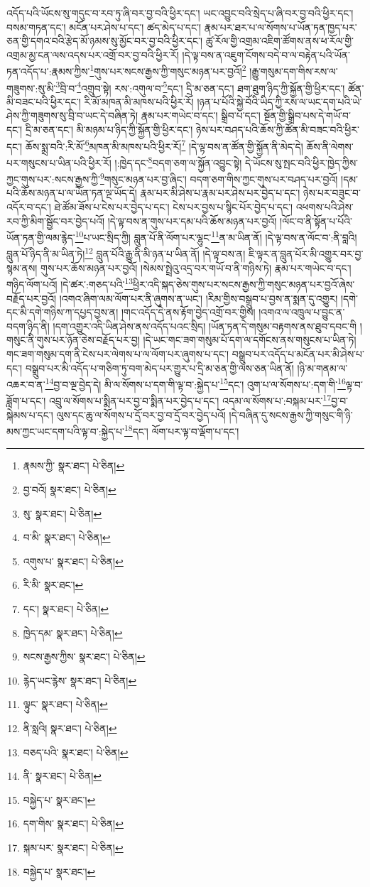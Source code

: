 འདོད་པའི་ཡོངས་སུ་གདུང་བ་རབ་ཏུ་ཞི་བར་བྱ་བའི་ཕྱིར་དང་། ཡང་འབྱུང་བའི་སྲེད་པ་ཞི་བར་བྱ་བའི་ཕྱིར་དང་། བསམ་གཏན་དང་། མངོན་པར་ཤེས་པ་དང་། ཚད་མེད་པ་དང་། རྣམ་པར་ཐར་པ་ལ་སོགས་པ་ཡོན་ཏན་ཁྱད་པར་ཅན་གྱི་དགའ་བའི་རྩེད་མོ་ཉམས་སུ་མྱོང་བར་བྱ་བའི་ཕྱིར་དང་། ཚུ་རོལ་གྱི་འགྲམ་འཇིག་ཚོགས་ནས་ཕ་རོལ་གྱི་འགྲམ་མྱ་ངན་ལས་འདས་པར་འགྲོ་བར་བྱ་བའི་ཕྱིར་རོ། །དེ་ལྟ་བས་ན་འཇུག་ངོགས་བདེ་བ་ལ་བརྟེན་པའི་ཡོན་ཏན་འདོད་པ་:རྣམས་ཀྱིས་\footnote{རྣམས་ཀྱི་  སྣར་ཐང་།  པེ་ཅིན། }གུས་པར་སངས་རྒྱས་ཀྱི་གསུང་མཉན་པར་བྱའོ།\footnote{བྱ་བའོ།  སྣར་ཐང་།  པེ་ཅིན། } །རྒྱུ་གསུམ་དག་གིས་རས་ལ་གཟུགས་:སུ་མི་\footnote{སུ་  སྣར་ཐང་།  པེ་ཅིན། }བྲི་བ་\footnote{བ་མི་  སྣར་ཐང་།  པེ་ཅིན། }འགྲུབ་སྟེ། རས་:འགུལ་བ་\footnote{འགུས་པ་  སྣར་ཐང་།  པེ་ཅིན། }དང་། དྲི་མ་ཅན་དང་། ཐག་ཐུག་ཉིད་ཀྱི་སྐྱོན་གྱི་ཕྱིར་དང་། ཚོན་མི་བཟང་པའི་ཕྱིར་དང་། རི་མོ་མཁན་མི་མཁས་པའི་ཕྱིར་རོ། །ཉན་པ་པོའི་སྐྱེ་བོའི་ཡིད་ཀྱི་རས་ལ་ཡང་དག་པའི་ཡེ་ཤེས་ཀྱི་གཟུགས་སུ་བྲི་བ་ཡང་དེ་བཞིན་ཏེ། རྣམ་པར་གཡེང་བ་དང་། སྒྲིབ་པ་དང་། སྔོན་གྱི་སྒྲིབ་པས་དེ་གཡོ་བ་དང་། དྲི་མ་ཅན་དང་། མི་མཉམ་པ་ཉིད་ཀྱི་སྐྱོན་གྱི་ཕྱིར་དང་། ཉེས་པར་བཤད་པའི་ཆོས་ཀྱི་ཚོན་མི་བཟང་བའི་ཕྱིར་དང་། ཆོས་སྨྲ་བའི་:རི་མོ་\footnote{རི་མི་  སྣར་ཐང་། }མཁན་མི་མཁས་པའི་ཕྱིར་རོ།\footnote{དང་།  སྣར་ཐང་།  པེ་ཅིན། } །དེ་ལྟ་བས་ན་ཚོན་གྱི་སྐྱོན་ནི་མེད་དེ། ཆོས་ནི་ལེགས་པར་གསུངས་པ་ཡིན་པའི་ཕྱིར་རོ། །:ཁྱེད་དང་\footnote{ཁྱེད་དམ་  སྣར་ཐང་།  པེ་ཅིན། }བདག་ཅག་ལ་སྐྱོན་འབྱུང་སྟེ། དེ་ཡོངས་སུ་སྤང་བའི་ཕྱིར་ཁྱེད་ཀྱིས་ཀྱང་གུས་པར་:སངས་རྒྱས་ཀྱི་\footnote{སངས་རྒྱས་ཀྱིས་  སྣར་ཐང་།  པེ་ཅིན། }གསུང་མཉན་པར་བྱ་ཞིང་། བདག་ཅག་གིས་ཀྱང་གུས་པར་བཤད་པར་བྱའོ། །དམ་པའི་ཆོས་མཉན་པ་ལ་ཡོན་ཏན་ལྔ་ཡོད་དེ། རྣམ་པར་མི་ཤེས་པ་རྣམ་པར་ཤེས་པར་བྱེད་པ་དང་། ཉེས་པར་བཟུང་བ་འདོར་བ་དང་། ཐེ་ཚོམ་ཟོས་པ་ངེས་པར་བྱེད་པ་དང་། ངེས་པར་བྱས་པ་སྙིང་པོར་བྱེད་པ་དང་། འཕགས་པའི་ཤེས་རབ་ཀྱི་མིག་སྦྱོང་བར་བྱེད་པའོ། །དེ་ལྟ་བས་ན་གུས་པར་དམ་པའི་ཆོས་མཉན་པར་བྱའོ། །ལོང་བ་ནི་སྟོན་པ་པོའི་ཡོན་ཏན་གྱི་ལམ་རྙེད་\footnote{རྙེད་ཡང་རྙེས་  སྣར་ཐང་།  པེ་ཅིན། }པ་ཡང་སྲིད་ཀྱི། བླུན་པོ་ནི་ལོག་པར་ལྷུང་\footnote{ལྟུང་  སྣར་ཐང་།  པེ་ཅིན། }ན་མ་ཡིན་ནོ། །དེ་ལྟ་བས་ན་ལོང་བ་:ནི་བླའི། བླུན་པོ་ཉིད་ནི་མ་ཡིན་ཏེ།\footnote{ནི་སླའི།  སྣར་ཐང་།  པེ་ཅིན། } བླུན་པོའི་རྒྱུ་ནི་མི་ཉན་པ་ཡིན་ནོ། །དེ་ལྟ་བས་ན། ཇི་ལྟར་ན་བླུན་པོར་མི་འགྱུར་བར་བྱ་སྙམ་ནས། གུས་པར་ཆོས་མཉན་པར་བྱའོ། །སེམས་སྤྲེའུ་འདྲ་བར་གཡོ་བ་ནི་གཉིས་ཏེ། རྣམ་པར་གཡེང་བ་དང་། གཉིད་ལོག་པའོ། །དེ་ཚར་:གཅད་པའི་\footnote{བཅད་པའི་  སྣར་ཐང་།  པེ་ཅིན། }ཕྱིར་འདི་སྐད་ཅེས་གུས་པར་སངས་རྒྱས་ཀྱི་གསུང་མཉན་པར་བྱའོ་ཞེས་བརྗོད་པར་བྱའོ། །འགའ་ཞིག་ལམ་ལོག་པར་ནི་ཞུགས་ན་ཡང་། །རིམ་གྱིས་བསྒྲུབ་པ་བྱས་ན་སྨན་དུ་འགྱུར། །དགེ་དང་མི་དགེ་གཉིས་ཀ་དཔྱད་བྱས་ན། །གང་འདོད་དེ་ནས་རྟོག་བྱེད་འགྲོ་བར་གྱིས། །འགའ་ལ་འཁྲུལ་པ་བྱུང་ན་བདག་ཉིད་ནི། །དག་འགྱུར་འདི་ཡིན་ཤེས་ནས་འདོད་པའང་སྲིད། །ཡོན་ཏན་དེ་གསུམ་བརྟགས་ནས་ཐུབ་དབང་གི །གསུང་ནི་གུས་པར་ཉོན་ཅེས་བརྗོད་པར་བྱ། །དེ་ཡང་གང་ཟག་གསུམ་པོ་དག་ལ་དགོངས་ནས་གསུངས་པ་ཡིན་ཏེ། གང་ཟག་གསུམ་དག་ནི་ངེས་པར་ལེགས་པ་ལ་ལོག་པར་ཞུགས་པ་དང་། བསྒྲུབ་པར་འདོད་པ་མངོན་པར་མི་ཤེས་པ་དང་། བསྒྲུབ་པར་མི་འདོད་པ་གཅིག་ཏུ་བག་མེད་པར་གྱུར་པ་དྲི་མ་ཅན་གྱི་ལས་ཅན་ཡིན་ནོ། །ཉི་མ་གནམ་ལ་འཆར་བ་ན་\footnote{ནི་  སྣར་ཐང་།  པེ་ཅིན། }བྱ་བ་ལྔ་བྱེད་དེ། མི་ལ་སོགས་པ་དག་གི་ལྟ་བ་:སྐྱེད་པ་\footnote{བསྐྱེད་པ་  སྣར་ཐང་། }དང་། འུག་པ་ལ་སོགས་པ་:དག་གི་\footnote{དག་གིས་  སྣར་ཐང་།  པེ་ཅིན། }ལྟ་བ་ཟློག་པ་དང་། འབྲུ་ལ་སོགས་པ་སྨིན་པར་བྱ་བ་སྨིན་པར་བྱེད་པ་དང་། འདམ་ལ་སོགས་པ་:བསྐམ་པར་\footnote{སྐམ་པར་  སྣར་ཐང་།  པེ་ཅིན། }བྱ་བ་སྐེམས་པ་དང་། ལུས་དང་ཆུ་ལ་སོགས་པ་དྲོ་བར་བྱ་བ་དྲོ་བར་བྱེད་པའོ། །དེ་བཞིན་དུ་སངས་རྒྱས་ཀྱི་གསུང་གི་ཉི་མས་ཀྱང་ཡང་དག་པའི་ལྟ་བ་:སྐྱེད་པ་\footnote{བསྐྱེད་པ་  སྣར་ཐང་། }དང་། ལོག་པར་ལྟ་བ་ལྡོག་པ་དང་། 
